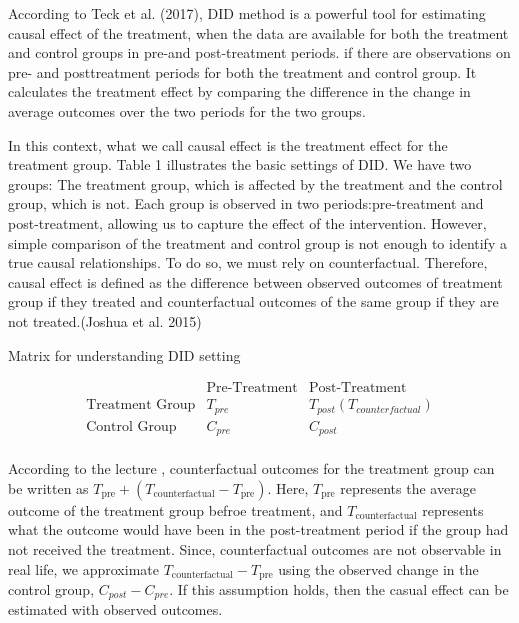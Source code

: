 \documentclass[letterpaper,12pt]{article}
\theoremstyle{definition}
\begin{document}
 According to \cite{Teck2017}Teck et al. (2017), DID method is a powerful tool for estimating causal effect of the treatment, when the data are available for both the treatment and control groups in pre-and post-treatment periods. if there are observations on pre- and posttreatment periods for both the treatment and control group. It calculates the treatment effect by comparing the difference in the change in average outcomes over the two periods for the two groups. 
 
 In this context, what we call causal effect is the treatment effect for the treatment group. Table 1 illustrates the basic settings of DID. We have two groups: The treatment group, which is affected by the treatment and the control group, which is not. Each group is observed in two periods:pre-treatment and post-treatment, allowing us to capture the effect of the intervention. 
 However, simple comparison of the treatment and control group is not enough to identify a true causal relationships. To do so, we must rely on counterfactual. Therefore, causal effect is defined as the difference between observed outcomes of treatment group if they treated and counterfactual outcomes of the same group if they are not treated.(Joshua et al. 2015)\cite{joshua2015}
 
 
    \begin{table}[H]
 \centering
 \caption{Matrix for understanding DID setting}
 \[
 \begin{array}{c|cc}
 	& \text{Pre-Treatment} & \text{Post-Treatment} \\ \hline
 	\text{Treatment Group}   & T_{pre} & T_{post} (T_{counterfactual})\\
 	\text{Control Group} & C_{pre} & C_{post} \\
 \end{array}
 \] 
\end{table}

   According to the lecture \cite{YouTube2023}, counterfactual outcomes for the treatment group can be written as $T_{\text{pre}} + (T_{\text{counterfactual}}-T_{\text{pre}})$. Here, $T_{\text{pre}}$ represents the average outcome of the treatment group befroe treatment, and $T_{\text{counterfactual}}$ represents what the outcome would have been in the post-treatment period if the group had not received the treatment. 
  Since, counterfactual outcomes are not observable in real life, we approximate $T_{\text{counterfactual}}-T_{\text{pre}}$ using the observed change in the control group, $C_{post} - C_{pre}$. If this assumption holds, then the casual effect can be estimated with observed outcomes.  
 
\end{document}
